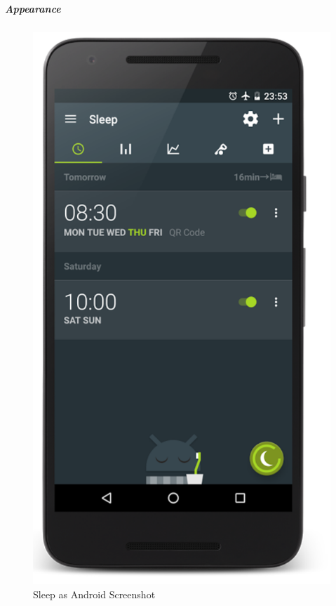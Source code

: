 \subparagraph{Appearance}\label{appearance}

\begin{figure}
  \begin{center}
    \includegraphics[scale=0.5,keepaspectratio]{Images/sleepas.png}
    \caption{Sleep as Android Screenshot}
  \end{center}
\end{figure}

